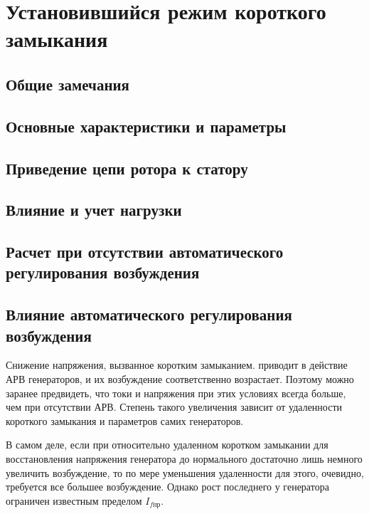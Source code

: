 \chapter{Установившийся режим короткого замыкания}
\label{chap:5}

\section{Общие замечания}
\label{sec:5-1}


\section{Основные характеристики и параметры}
\label{sec:5-2}


\section{Приведение цепи ротора к статору}
\label{sec:5-3}


\section{Влияние и учет нагрузки}
\label{sec:5-4}


\section{Расчет при отсутствии автоматического регулирования возбуждения}
\label{sec:5-5}


\section{Влияние автоматического регулирования возбуждения}
\label{sec:5-6}

Снижение напряжения, вызванное коротким замыканием. приводит в действие АРВ генераторов, и их возбуждение соответственно возрастает. Поэтому можно заранее предвидеть, что токи и напряжения при этих условиях всегда больше, чем при отсутствии АРВ. Степень такого увеличения зависит от удаленности короткого замыкания и параметров самих генераторов.

В самом деле, если при относительно удаленном коротком замыкании для восстановления напряжения генератора до нормального достаточно лишь немного увеличить возбуждение, то по мере уменьшения удаленности для этого, очевидно, требуется все большее возбуждение. Однако рост последнего у генератора ограничен известным пределом $ I_{f\text{пр}} $.

